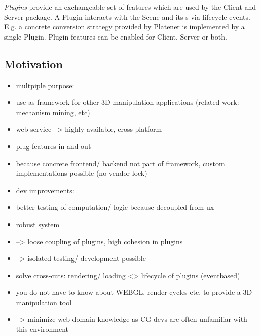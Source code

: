 \documentclass[../ClassicThesis.tex]{subfiles}
\begin{document}
\emph{Plugins} provide an exchangeable set of features which are used by the Client and Server package. A Plugin interacts with the Scene and its {\threedmodel}s via lifecycle events. E.g. a concrete conversion strategy provided by Platener is implemented by a single Plugin. Plugin features can be enabled for Client, Server or both. 

\subsection{Motivation}
\begin{itemize}
\item multpiple purpose:
\item use as framework for other 3D manipulation applications (related work: mechanism mining, etc)
\item web service --> highly available, cross platform
\item plug features in and out
\item because concrete frontend/ backend not part of framework, custom implementations possible (no vendor lock)

\item dev improvements:
\item better testing of computation/ logic because decoupled from ux
\item robust system
\item --> loose coupling of plugins, high cohesion in plugins
\item --> isolated testing/ development possible
\item solve cross-cuts: rendering/ loading <> lifecycle of plugins (eventbased)
\item you do not have to know about WEBGL, render cycles etc. to provide a 3D manipulation tool
\item --> minimize web-domain knowledge as CG-devs are often unfamiliar with this environment
\end{itemize}
\end{document}
